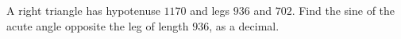 A right triangle has hypotenuse $1170$ and legs $936$ and $702$. Find the sine of the acute angle opposite the leg of length $936$, as a decimal.
